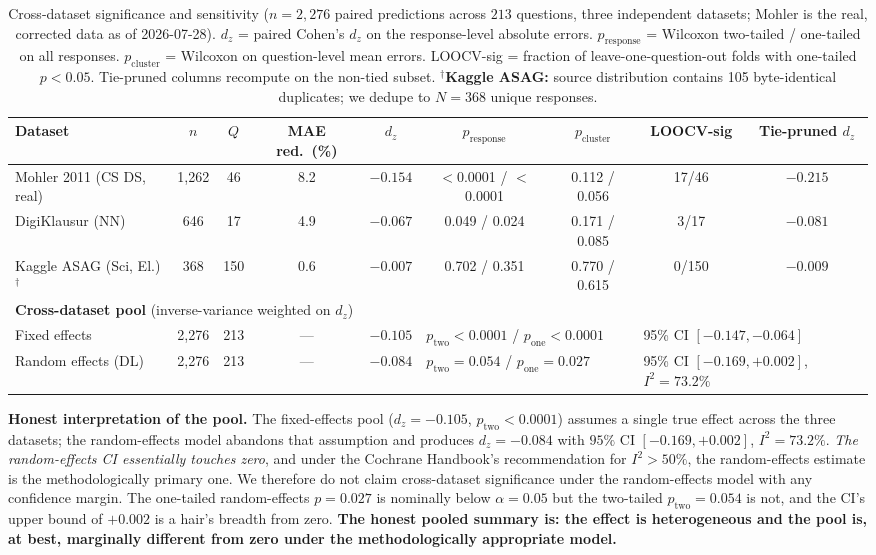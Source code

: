 \documentclass[conference]{IEEEtran}
\begin{document}
\begin{table}[t]
\caption{Cross-dataset significance and sensitivity ($n = 2{,}276$ paired
predictions across $213$ questions, three independent datasets; Mohler is
the real, corrected data as of 2026-07-28). $d_z$ = paired Cohen's $d_z$ on the response-level
absolute errors. $p_{\text{response}}$ = Wilcoxon two-tailed / one-tailed
on all responses. $p_{\text{cluster}}$ = Wilcoxon on question-level mean
errors. LOOCV-sig = fraction of leave-one-question-out folds with
one-tailed $p < 0.05$. Tie-pruned columns recompute on the non-tied
subset.
\textbf{$^{\dagger}$Kaggle ASAG:} source distribution contains 105
byte-identical duplicates; we dedupe to $N=368$ unique responses.}
\label{tab:crossdataset_sensitivity}
\centering
\footnotesize
\begin{tabular}{lcccccccc}
\toprule
\textbf{Dataset} & $n$ & $Q$ & \textbf{MAE red.\ (\%)} & $d_z$ &
\textbf{$p_{\text{response}}$} & \textbf{$p_{\text{cluster}}$} &
\textbf{LOOCV-sig} & \textbf{Tie-pruned $d_z$} \\
\midrule
Mohler 2011 (CS DS, real)  & 1{,}262 &  46 & 8.2 & $-0.154$ &
$<$0.0001 / $<$0.0001 & 0.112 / 0.056 & 17/46 & $-0.215$ \\
DigiKlausur (NN)           & 646 &  17 &  4.9 & $-0.067$ &
0.049 / 0.024 & 0.171 / 0.085 &  3/17 & $-0.081$ \\
Kaggle ASAG (Sci, El.)$^{\dagger}$ & 368 & 150 &  0.6 & $-0.007$ &
0.702 / 0.351 & 0.770 / 0.615 &  0/150 & $-0.009$ \\
\midrule
\multicolumn{9}{l}{\textbf{Cross-dataset pool} (inverse-variance weighted on $d_z$)} \\
\quad Fixed effects        & 2{,}276 & 213 & --- & $-0.105$ &
\multicolumn{2}{l}{$p_{\text{two}} < 0.0001$ / $p_{\text{one}} < 0.0001$} &
\multicolumn{2}{l}{95\% CI $[-0.147, -0.064]$} \\
\quad Random effects (DL)  & 2{,}276 & 213 & --- & $-0.084$  &
\multicolumn{2}{l}{$p_{\text{two}} = 0.054$ / $p_{\text{one}} = 0.027$} &
\multicolumn{2}{l}{95\% CI $[-0.169, +0.002]$, $I^2 = 73.2\%$} \\
\bottomrule
\end{tabular}
\end{table}

\textbf{Honest interpretation of the pool.} The fixed-effects pool
($d_z = -0.105$, $p_{\text{two}} < 0.0001$) assumes a single true effect
across the three datasets; the random-effects model abandons that assumption
and produces $d_z = -0.084$ with $95\%$ CI $[-0.169, +0.002]$, $I^2 = 73.2\%$.
\emph{The random-effects CI essentially touches zero}, and under the Cochrane
Handbook's recommendation for $I^2 > 50\%$, the random-effects estimate is
the methodologically primary one. We therefore do not claim cross-dataset
significance under the random-effects model with any confidence margin.
The one-tailed random-effects $p = 0.027$ is nominally below $\alpha=0.05$
but the two-tailed $p_{\text{two}} = 0.054$ is not, and the CI's upper
bound of $+0.002$ is a hair's breadth from zero. \textbf{The
honest pooled summary is: the effect is heterogeneous and the pool is, at
best, marginally different from zero under the methodologically appropriate
model.}
\end{document}

